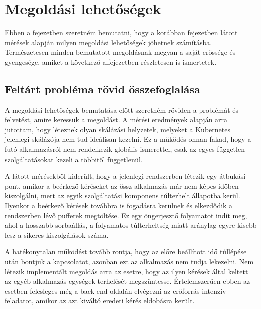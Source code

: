 \chapter{Megoldási lehetőségek}
\label{sec:solutions}

Ebben a fejezetben szeretném bemutatni, hogy a korábban  fejezetben látott mérések alapján milyen megoldási lehetőségek jöhetnek számításba.
Természetesen minden bemutatott megoldásnak megvan a saját erőssége és gyengesége, amiket a következő alfejezetben részletesen is ismertetek.

\section{Feltárt probléma rövid összefoglalása}

A megoldási lehetőségek bemutatása előtt szeretném röviden  a problémát és felvetést, amire keressük a megoldást.
A mérési eredmények alapján arra jutottam, hogy léteznek olyan skálázási helyzetek, melyeket a Kubernetes jelenlegi skálázója nem tud ideálisan kezelni.
Ez a működés onnan fakad, hogy a futó alkalmazásról nem rendelkezik globális ismerettel, csak az egyes független szolgáltatásokat kezeli a többitől függetlenül.

A látott mérésekből kiderült, hogy a jelenlegi rendszerben létezik egy átbukási pont, amikor a beérkező kéréseket az össz alkalmazás már nem képes időben kiszolgálni, mert az egyik szolgáltatási komponens túlterhelt állapotba kerül.
Ilyenkor a beérkező kérések továbbra is fogadásra kerülnek és elkezdődik a rendszerben lévő pufferek megtöltése.
Ez egy öngerjesztő folyamatot indít meg, ahol a hosszabb sorbaállás, a folyamatos túlterheltség miatt aránylag egyre kisebb lesz a sikeres kiszolgálások száma. 

A hatékonytalan működést tovább rontja, hogy az előre beállított idő túllépése után bontjuk a kapcsolatot, azonban ezt az alkalmazás nem tudja lekezelni.
Nem létezik implementált megoldás arra az esetre, hogy az ilyen kérések által keltett az egyéb alkalmazás egységek terhelését megszüntesse.
Értelemszerűen ebben az esetben felesleges még a back-end oldalán elvégezni az erőforrás intenzív feladatot, amikor az azt kiváltó eredeti kérés eldobásra került.

